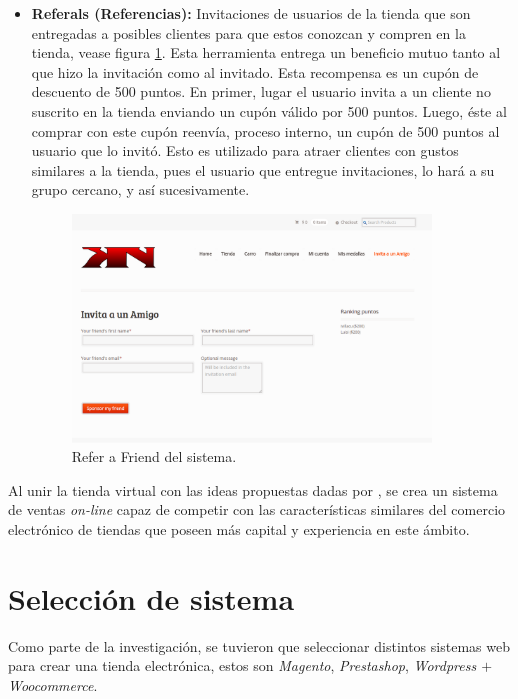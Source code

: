 \begin{itemize}
    \item {\bf Referals (Referencias):}
        Invitaciones de usuarios de la tienda que son entregadas a posibles
        clientes para que estos conozcan y compren en la tienda, vease figura 
	\ref{fig:referal}.
        Esta herramienta entrega un beneficio mutuo tanto al que hizo la invitación
        como al invitado. Esta recompensa es un cupón de descuento de 500 puntos.
        En primer, lugar el usuario invita a un cliente no suscrito en la tienda
        enviando un cupón válido por 500 puntos.
        Luego, éste al comprar con este cupón reenvía,
        proceso interno, un cupón de 500 puntos al usuario que lo invitó.
        Esto es utilizado para atraer clientes con gustos similares
        a la tienda, pues el usuario que entregue invitaciones, lo hará a su
        grupo cercano, y así sucesivamente.

\begin{figure}[!htb]
  \centering
  \includegraphics[width=0.9\textwidth]{images/Tienda/Tienda_referal.png}
  \caption[Referal]{Refer a Friend del sistema.}
  \label{fig:referal}
\end{figure}

\end{itemize}

Al unir la tienda virtual con las ideas propuestas dadas por {\gam}, se crea un
sistema de ventas \emph{on-line} capaz de competir con las características similares del
comercio electrónico de tiendas que poseen más capital y experiencia en este ámbito.

\section{Selección de sistema}

Como parte de la investigación, se tuvieron que seleccionar distintos sistemas web para
crear una tienda electrónica, estos son \emph{Magento}, \emph{Prestashop}, \emph{Wordpress
$+$ Woocommerce}.

